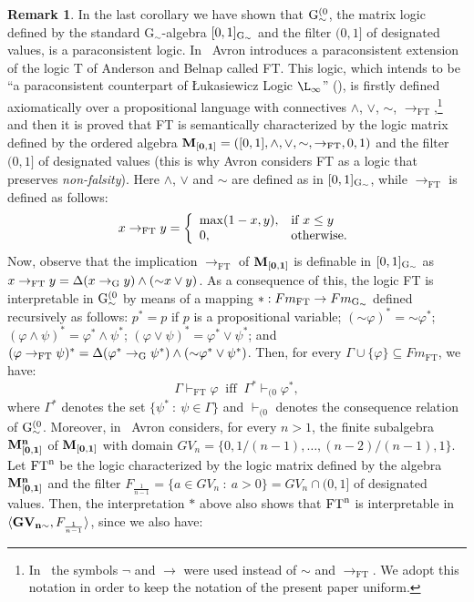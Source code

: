 \documentclass{article}
\theoremstyle{definition}
\newtheorem{remark}{Remark}
\newcommand{\ninv}{\mathord{\sim}}
\begin{document}
\begin{remark} In the last corollary we have shown that ${\rm G}^{(0}_\sim$,  the matrix logic defined by the standard G$_{\ninv}$-algebra $[0,1]_{\rm{G}_\sim}$ and the filter $(0,1]$  of designated values, is a paraconsistent logic. In~\cite{Avron16} {Avron introduces} a paraconsistent extension of the logic {T} of Anderson and Belnap called { FT}. This logic, which intends to be ``a paraconsistent counterpart of \L ukasiewicz Logic $\L_\infty$'' (\cite[pp.~75]{Avron16}), is firstly defined axiomatically over {a propositional language with} connectives $\land$, $\lor$, ${\sim}$, $\to_\mathrm{FT}$,\footnote{In~\cite{Avron16} the symbols $\neg$ and $\to$ were used instead of ${\sim}$ and $\to_\mathrm{FT}$. We adopt this notation in order to keep the notation of the present paper uniform.} and then it {is} proved that {FT} is semantically characterized by the logic matrix defined by the ordered algebra ${\bf M_{[0,1]}} = ( [0, 1], \land, \lor,  {\sim}, \to_\mathrm{FT},0,1)$ and the filter $(0,1]$  of designated values ({this is why Avron considers  {FT} as a logic that preserves {\em non-falsity}}). Here 
$\land$, $\lor$ and $\sim$ are defined as in ${[0,1]_{\rm{G}_\sim}}$, while $\to_\mathrm{FT}$ is defined as follows: 
$$x \to_\mathrm{FT} y = \left \{
\begin{array}{l l}
\max(1-x, y), & \mbox{if } x \leq y \\
0, & {\rm otherwise.} 
\end{array} \right .
$$ 
Now, observe that the implication $\to_\mathrm{FT}$ of  ${\bf M_{[0,1]}}$ is definable in  $[0,1]_{\rm{G}_\sim}$ as $x \to_\mathrm{FT} y = \Delta(x \to_{\rm{G}} y) \land (\ninv x \lor y)$. As a consequence of this, the logic {FT} is interpretable in ${\rm G}^{(0}_\sim$ by means of a mapping $*: Fm_\mathrm{FT} \to  Fm_{{\rm{G}}_\sim}$ defined recursively as follows: $p^*=p$ if $p$ is a propositional variable;  $(\ninv \varphi)^* = \ninv \varphi^*$;  $(\varphi\land \psi)^* = \varphi^* \land \psi^*$;  $(\varphi\lor \psi)^* = \varphi^* \lor \psi^*$;  and $(\varphi \to_\mathrm{FT} \psi)^* = \Delta(\varphi^* \to_{\rm{G}} \psi^*) \land (\ninv \varphi^* \lor \psi^*)$. Then, for every $\Gamma \cup \{\varphi\} \subseteq  Fm_\mathrm{FT}$, we have:
%
$$\Gamma \vdash_\mathrm{FT} \varphi \ \mbox{ iff } \ \Gamma^* \vdash_{(0} \varphi^*,$$
where $\Gamma^*$ denotes the set $\{\psi^* \ : \ \psi \in \Gamma\}$ and $ \vdash_{(0}$ denotes the consequence relation of ${\rm G}^{(0}_\sim$.
Moreover, in~\cite[Example~3.4]{Avron16} Avron considers, for every $n > 1$,  the finite subalgebra $\bf M_{[0,1]}^n$ of $\bf M_{[0,1]}$ with domain $GV_n = \{0, 1/(n-1), \ldots, (n-2)/(n-1), 1\}$. Let $\rm {FT}^n$ be the logic characterized by the logic matrix defined by the algebra $\bf M_{[0,1]}^n$ and the filter $F_{\frac{1}{n-1}} = \{ a \in GV_n \ : \ a > 0\} = GV_n\cap  (0,1]$  of designated values. Then, the interpretation $*$ above also shows that $\rm {FT}^n$ is interpretable in $\langle {\bf GV_{n\sim}},F_{\frac{1}{n-1}}\rangle$, since we also have:

\end{remark}
\end{document}
